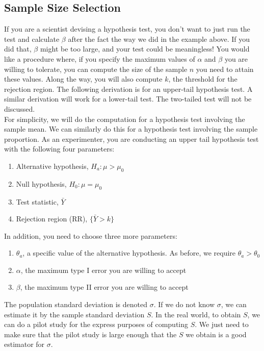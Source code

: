 \documentclass[12pt]{article}
\theoremstyle{definition}
\theoremstyle{remark}
\begin{document}
\subsection{Sample Size Selection}

If you are a scientist devising a hypothesis test, you don't want to just run the test and calculate $\beta$ after the fact the way we did in the example above. If you did that, $\beta$ might be too large, and your test could be meaningless! You would like a procedure where, if you specify the maximum values of $\alpha$ and $\beta$ you are willing to tolerate, you can compute the size of the sample $n$ you need to attain these values. Along the way, you will also compute $k$, the threshold for the rejection region. The following derivation is for an upper-tail hypothesis test. A similar derivation will work for a lower-tail test. The two-tailed test will not be discussed.\\

For simplicity, we will do the computation for a hypothesis test involving the sample mean. We can similarly do this for a hypothesis test involving the sample proportion. As an experimenter, you are conducting an upper tail hypothesis test with the following four parameters:
\begin{enumerate}
\item Alternative hypothesis, $H_a: \mu > \mu_0$
\item Null hypothesis, $H_0: \mu = \mu_0$
\item Test statistic, $\bar{Y}$
\item Rejection region (RR), $\{ \bar{Y} > k \}$
\end{enumerate}
In addition, you need to choose three more parameters:
\begin{enumerate}
\item $\theta_a$, a specific value of the alternative hypothesis. As before, we require $\theta_a > \theta_0$
\item $\alpha$, the maximum type I error you are willing to accept
\item $\beta$, the maximum type II error you are willing to accept
\end{enumerate}
The population standard deviation is denoted $\sigma$. If we do not know $\sigma$, we can estimate it by the sample standard deviation $S$. In the real world, to obtain $S$, we can do a pilot study for the express purposes of computing $S$. We just need to make sure that the pilot study is large enough that the $S$ we obtain is a good estimator for $\sigma$.\\
\end{document}
